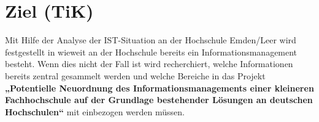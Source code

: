 \section{Ziel (TiK)}
Mit Hilfe der Analyse der IST-Situation an der Hochschule Emden/Leer wird festgestellt in wieweit an der Hochschule bereits ein Informationsmanagement besteht. Wenn dies nicht der Fall ist wird recherchiert, welche Informationen bereits zentral gesammelt werden und welche Bereiche in das Projekt \textbf{„Potentielle Neuordnung des Informationsmanagements einer kleineren Fachhochschule auf der Grundlage bestehender Lösungen an deutschen Hochschulen“} mit einbezogen werden müssen.